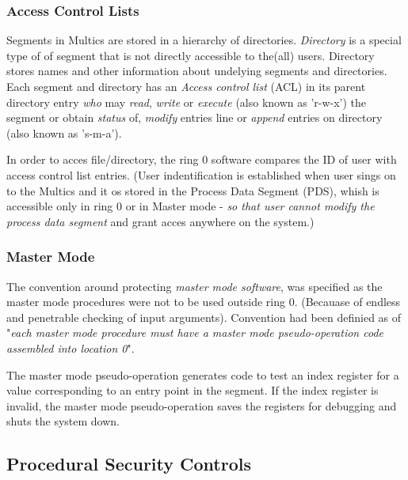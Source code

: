 

\subsubsection{Access Control Lists}

Segments in Multics are stored in a hierarchy of directories. \textit{Directory} is a special type of of
segment that is not directly accessible to the(all) users.
Directory stores names and other information about undelying segments and directories.
Each segment and directory has an \textit{Access control list} (ACL) in its parent directory entry
\textit{who} may \textit{read}, \textit{write} or \textit{execute} (also known as 'r-w-x') the segment or obtain 
\textit{status} of, \textit{modify} entries line or \textit{append} entries on directory (also known as 's-m-a').

In order to acces file/directory, the ring 0 software compares the ID of user with access control list entries.
(User indentification is established when user sings on to the Multics and it os stored in the Process Data 
Segment (PDS), whish is accessible only in ring 0 or in Master mode - \textit{so that user cannot modify the
process data segment} and grant acces anywhere on the system.)

\subsubsection{Master Mode}

The convention around protecting \textit{master mode software}, was specified as the master mode procedures
were not to be used outside ring 0. (Becauase of endless and penetrable checking of input arguments).
Convention had been definied as of "\textit{each master mode procedure must have a master mode pseudo-operation
 code assembled into location 0}".

 The master mode pseudo-operation generates code to test an index register for a value corresponding to an 
 entry point in the segment. If the index register is invalid, the master mode pseudo-operation saves the
 registers for debugging and shuts the system down.

 
 \subsection{Procedural Security Controls}

